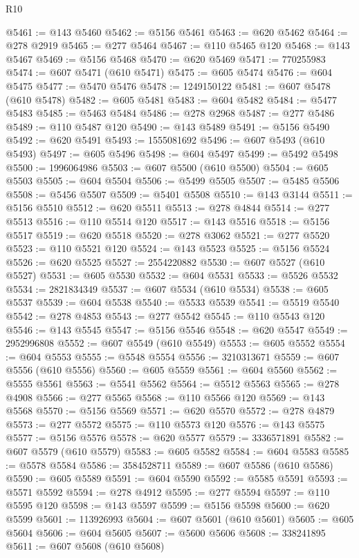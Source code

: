 \begin{lexlean}{R10}
\begin{coremodule}
@5461 := @143 @5460
@5462 := @5156 @5461
@5463 := @620 @5462
@5464 := @278 @2919
@5465 := @277 @5464
@5467 := @110 @5465 @120
@5468 := @143 @5467
@5469 := @5156 @5468
@5470 := @620 @5469
@5471 := 770255983
@5474 := @607 @5471 (@610 @5471)
@5475 := @605 @5474
@5476 := @604 @5475
@5477 := @5470 @5476
@5478 := 1249150122
@5481 := @607 @5478 (@610 @5478)
@5482 := @605 @5481
@5483 := @604 @5482
@5484 := @5477 @5483
@5485 := @5463 @5484
@5486 := @278 @2968
@5487 := @277 @5486
@5489 := @110 @5487 @120
@5490 := @143 @5489
@5491 := @5156 @5490
@5492 := @620 @5491
@5493 := 1555081692
@5496 := @607 @5493 (@610 @5493)
@5497 := @605 @5496
@5498 := @604 @5497
@5499 := @5492 @5498
@5500 := 1996064986
@5503 := @607 @5500 (@610 @5500)
@5504 := @605 @5503
@5505 := @604 @5504
@5506 := @5499 @5505
@5507 := @5485 @5506
@5508 := @5456 @5507
@5509 := @5401 @5508
@5510 := @143 @3144
@5511 := @5156 @5510
@5512 := @620 @5511
@5513 := @278 @4844
@5514 := @277 @5513
@5516 := @110 @5514 @120
@5517 := @143 @5516
@5518 := @5156 @5517
@5519 := @620 @5518
@5520 := @278 @3062
@5521 := @277 @5520
@5523 := @110 @5521 @120
@5524 := @143 @5523
@5525 := @5156 @5524
@5526 := @620 @5525
@5527 := 2554220882
@5530 := @607 @5527 (@610 @5527)
@5531 := @605 @5530
@5532 := @604 @5531
@5533 := @5526 @5532
@5534 := 2821834349
@5537 := @607 @5534 (@610 @5534)
@5538 := @605 @5537
@5539 := @604 @5538
@5540 := @5533 @5539
@5541 := @5519 @5540
@5542 := @278 @4853
@5543 := @277 @5542
@5545 := @110 @5543 @120
@5546 := @143 @5545
@5547 := @5156 @5546
@5548 := @620 @5547
@5549 := 2952996808
@5552 := @607 @5549 (@610 @5549)
@5553 := @605 @5552
@5554 := @604 @5553
@5555 := @5548 @5554
@5556 := 3210313671
@5559 := @607 @5556 (@610 @5556)
@5560 := @605 @5559
@5561 := @604 @5560
@5562 := @5555 @5561
@5563 := @5541 @5562
@5564 := @5512 @5563
@5565 := @278 @4908
@5566 := @277 @5565
@5568 := @110 @5566 @120
@5569 := @143 @5568
@5570 := @5156 @5569
@5571 := @620 @5570
@5572 := @278 @4879
@5573 := @277 @5572
@5575 := @110 @5573 @120
@5576 := @143 @5575
@5577 := @5156 @5576
@5578 := @620 @5577
@5579 := 3336571891
@5582 := @607 @5579 (@610 @5579)
@5583 := @605 @5582
@5584 := @604 @5583
@5585 := @5578 @5584
@5586 := 3584528711
@5589 := @607 @5586 (@610 @5586)
@5590 := @605 @5589
@5591 := @604 @5590
@5592 := @5585 @5591
@5593 := @5571 @5592
@5594 := @278 @4912
@5595 := @277 @5594
@5597 := @110 @5595 @120
@5598 := @143 @5597
@5599 := @5156 @5598
@5600 := @620 @5599
@5601 := 113926993
@5604 := @607 @5601 (@610 @5601)
@5605 := @605 @5604
@5606 := @604 @5605
@5607 := @5600 @5606
@5608 := 338241895
@5611 := @607 @5608 (@610 @5608)

\end{coremodule}
\end{lexlean}
